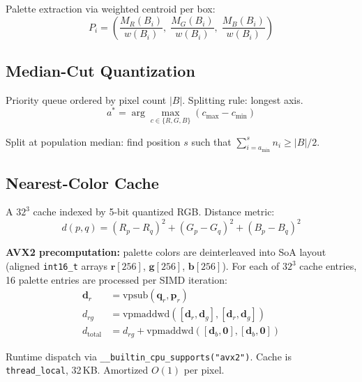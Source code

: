 \documentclass[11pt,a4paper]{article}
\begin{document}
Palette extraction via weighted centroid per box:
\begin{equation}
  P_i = \left(
    \frac{M_R(B_i)}{w(B_i)},\;
    \frac{M_G(B_i)}{w(B_i)},\;
    \frac{M_B(B_i)}{w(B_i)}
  \right)
\end{equation}

\subsection{Median-Cut Quantization}

Priority queue ordered by pixel count $|B|$. Splitting rule: longest axis.
\begin{equation}
  a^* = \arg\max_{c \in \{R,G,B\}} (c_{\max} - c_{\min})
\end{equation}

Split at population median: find position $s$ such that
$\sum_{i=a_{\min}}^{s} n_i \geq |B|/2$.

\subsection{Nearest-Color Cache}

A $32^3$ cache indexed by 5-bit quantized RGB.
Distance metric:
\begin{equation}
  d(p, q) = (R_p - R_q)^2 + (G_p - G_q)^2 + (B_p - B_q)^2
\end{equation}

\noindent\textbf{AVX2 precomputation:} palette colors are deinterleaved into
SoA layout (aligned \texttt{int16\_t} arrays $\mathbf{r}[256]$,
$\mathbf{g}[256]$, $\mathbf{b}[256]$). For each of $32^3$ cache entries,
16 palette entries are processed per SIMD iteration:
\begin{align}
  \mathbf{d}_r &= \mathrm{vpsub}(\mathbf{q}_r, \mathbf{p}_r) \\
  d_{rg} &= \mathrm{vpmaddwd}([\mathbf{d}_r, \mathbf{d}_g],
                               [\mathbf{d}_r, \mathbf{d}_g]) \\
  d_{\mathrm{total}} &= d_{rg} + \mathrm{vpmaddwd}([\mathbf{d}_b, \mathbf{0}],
                                                     [\mathbf{d}_b, \mathbf{0}])
\end{align}

Runtime dispatch via \texttt{\_\_builtin\_cpu\_supports("avx2")}.
Cache is \texttt{thread\_local}, 32\,KB. Amortized $O(1)$ per pixel.
\end{document}
